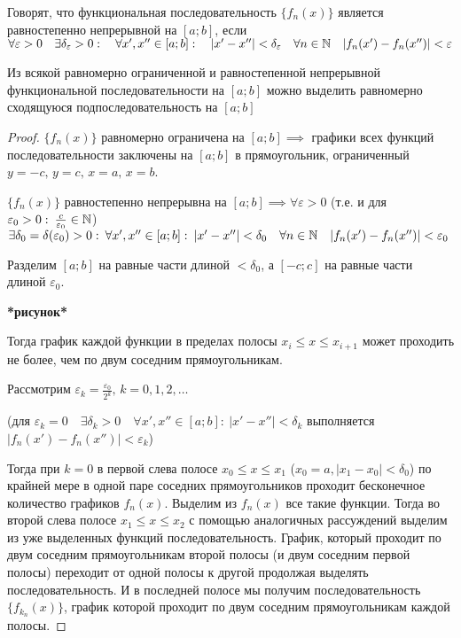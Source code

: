 \begin{definition}
    Говорят, что функциональная последовательность $\{ f_n(x) \}$ является
    равностепенно непрерывной на $[a; b]$, если $\forall \varepsilon > 0 \quad
    \exists \delta_\varepsilon > 0: \quad \forall x', x'' \in [a; b]: \quad
    |x' - x''| < \delta_\varepsilon \quad \forall n \in \mathbb{N} \quad
    |f_n(x') - f_n(x'')| < \varepsilon$
\end{definition}

\begin{theorem}[Арцела]
    Из всякой равномерно ограниченной и равностепенной непрерывной
    функциональной последовательности на $[a; b]$ можно выделить
    равномерно сходящуюся подпоследовательность на $[a; b]$
\end{theorem}
\begin{proof}
    $\{ f_n(x) \}$ равномерно ограничена на $[a; b] \implies$ графики всех
    функций последовательности заключены на $[a; b]$ в прямоугольник, 
    ограниченный $y = -c, \, y = c, \, x = a, \, x = b$.
    
    $\{ f_n(x) \}$ равностепенно непрерывна на $[a; b] \implies 
    \forall \varepsilon > 0$ (т.е. и для $\varepsilon_0 > 0: \: \frac{c}{\varepsilon_0} \in \mathbb{N}$)
    $\exists \delta_0 = \delta (\varepsilon_0) > 0: \: \forall x', x'' \in [a; b]: \:
    |x' - x''| < \delta_0 \quad \forall n \in \mathbb{N} \quad |f_n(x') - f_n(x'')| < \varepsilon_0$

    Разделим $[a; b]$ на равные части длиной $< \delta_0$, а $[-c; c]$ на
    равные части длиной $\varepsilon_0$.

    \textbf{*рисунок*}

    Тогда график каждой функции в пределах полосы $x_i \leq x \leq x_{i + 1}$
    может проходить не более, чем по двум соседним прямоугольникам.

    Рассмотрим $\varepsilon_k = \frac{\varepsilon_0}{2^k}, \, k = 0,1,2,\dots$

    (для $\varepsilon_k = 0 \quad \exists \delta_k > 0 \quad 
    \forall x', x'' \in [a; b]: \: |x' - x''| < \delta_k$ выполняется
    $|f_n(x') - f_n(x'')| < \varepsilon_k$)

    Тогда при $k = 0$ в первой слева полосе $x_0 \leq x \leq x_1$ 
    ($x_0 = a, |x_1 - x_0| < \delta_0$) по крайней мере в одной паре соседних
    прямоугольников проходит бесконечное количество графиков $f_n(x)$.
    Выделим из $f_n(x)$ все такие функции. Тогда во второй слева полосе
    $x_1 \leq x \leq x_2$ с помощью аналогичных рассуждений выделим из уже
    выделенных функций последовательность. График, который проходит по двум
    соседним прямоугольникам второй полосы (и двум соседним первой полосы)
    переходит от одной полосы к другой продолжая выделять последовательность.
    И в последней полосе мы получим последовательность $\{ f_{k_n} (x) \}$,
    график которой проходит по двум соседним прямоугольникам каждой полосы.


\end{proof}
